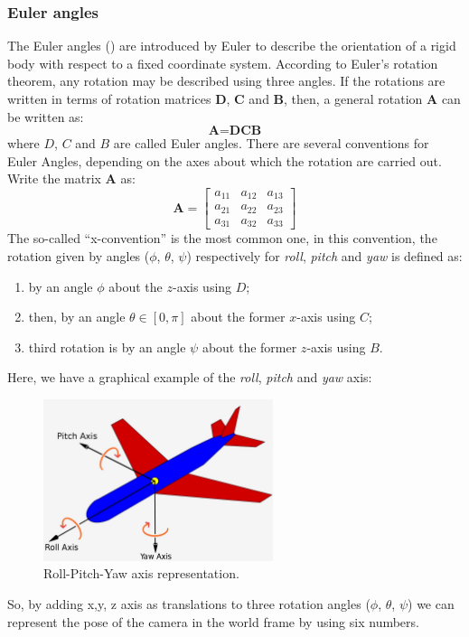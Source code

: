 \subsubsection*{Euler angles}
The Euler angles (\cite{euler_angles}) are introduced by Euler to describe the orientation of a rigid body with respect to a fixed coordinate system.
According to Euler's rotation theorem, any rotation may be described using three angles.
If the rotations are written in terms of rotation matrices \textbf{D}, \textbf{C} and \textbf{B}, then, a general rotation \textbf{A} can be written as:
\begin{equation}
    \textbf{A} = \textbf{D} \textbf{C} \textbf{B}
    \label{eq:general_rotation}
\end{equation}
where $D$, $C$ and $B$ are called Euler angles.
There are several conventions for Euler Angles, depending on the axes about which the rotation are carried out.
Write the matrix \textbf{A} as:
\begin{equation}
    \textbf{A} = \begin{bmatrix}
                     a_{11} & a_{12} & a_{13} \\
                     a_{21} & a_{22} & a_{23} \\
                     a_{31} & a_{32} & a_{33}
    \end{bmatrix}
    \label{eq:matrix_A}
\end{equation}
The so-called ``x-convention'' is the most common one, in this convention, the rotation given by angles ($\phi$, $\theta$, $\psi$) respectively for \textit{roll}, \textit{pitch} and \textit{yaw} is defined as:
\begin{enumerate}
    \item by an angle $\phi$ about the $z$-axis using $D$;
    \item then, by an angle $\theta \in [0,\pi]$ about the former $x$-axis using $C$;
    \item third rotation is by an angle $\psi$ about the former $z$-axis using $B$.
\end{enumerate}
Here, we have a graphical example of the \textit{roll}, \textit{pitch} and \textit{yaw} axis:
\begin{figure}[H]
    \centering
    \includegraphics[width=0.6\textwidth]{images/2_2_roll_pitch_yaw}
    \caption{Roll-Pitch-Yaw axis representation.}\label{fig:euler-angles}
\end{figure}
So, by adding x,y, z axis as translations to three rotation angles ($\phi$, $\theta$, $\psi$) we can represent the pose of the camera in the world frame by using six numbers.
